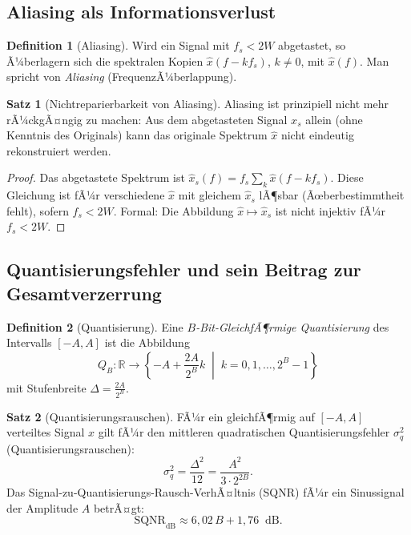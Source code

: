 ﻿\documentclass[a4paper,12pt]{article}
\theoremstyle{definition}
\newtheorem{definition}{Definition}
\newtheorem{satz}{Satz}
\begin{document}
\subsection{Aliasing als Informationsverlust}

\begin{definition}[Aliasing]
Wird ein Signal mit $f_s < 2W$ abgetastet, so Ã¼berlagern sich die spektralen
Kopien $\hat{x}(f - kf_s)$, $k \neq 0$, mit $\hat{x}(f)$.
Man spricht von \emph{Aliasing} (FrequenzÃ¼berlappung).
\end{definition}

\begin{satz}[Nichtreparierbarkeit von Aliasing]
Aliasing ist prinzipiell nicht mehr rÃ¼ckgÃ¤ngig zu machen:
Aus dem abgetasteten Signal $x_s$ allein (ohne Kenntnis des Originals)
kann das originale Spektrum $\hat{x}$ nicht eindeutig rekonstruiert werden.
\end{satz}

\begin{proof}
Das abgetastete Spektrum ist $\hat{x}_s(f) = f_s \sum_{k} \hat{x}(f-kf_s)$.
Diese Gleichung ist fÃ¼r verschiedene $\hat{x}$ mit gleichem $\hat{x}_s$
lÃ¶sbar (Ãœberbestimmtheit fehlt), sofern $f_s < 2W$.  Formal: Die Abbildung
$\hat{x} \mapsto \hat{x}_s$ ist nicht injektiv fÃ¼r $f_s < 2W$.
\end{proof}

\subsection{Quantisierungsfehler und sein Beitrag zur Gesamtverzerrung}

\begin{definition}[Quantisierung]
Eine \emph{$B$-Bit-GleichfÃ¶rmige Quantisierung} des Intervalls $[-A, A]$
ist die Abbildung
\[
Q_B: \mathbb{R} \to \left\{-A + \frac{2A}{2^B} k \;\middle|\; k = 0,1,\ldots,2^B-1\right\}
\]
mit Stufenbreite $\Delta = \frac{2A}{2^B}$.
\end{definition}

\begin{satz}[Quantisierungsrauschen]
\label{satz:quantisierung}
FÃ¼r ein gleichfÃ¶rmig auf $[-A,A]$ verteiltes Signal $x$ gilt fÃ¼r den
mittleren quadratischen Quantisierungsfehler $\sigma_q^2$ (Quantisierungsrauschen):
\[
\sigma_q^2 = \frac{\Delta^2}{12} = \frac{A^2}{3 \cdot 2^{2B}}.
\]
Das Signal-zu-Quantisierungs-Rausch-VerhÃ¤ltnis (SQNR) fÃ¼r ein Sinussignal
der Amplitude $A$ betrÃ¤gt:
\[
\mathrm{SQNR}_{\mathrm{dB}} \approx 6{,}02\,B + 1{,}76 \;\;\mathrm{dB}.
\]
\end{satz}
\end{document}
